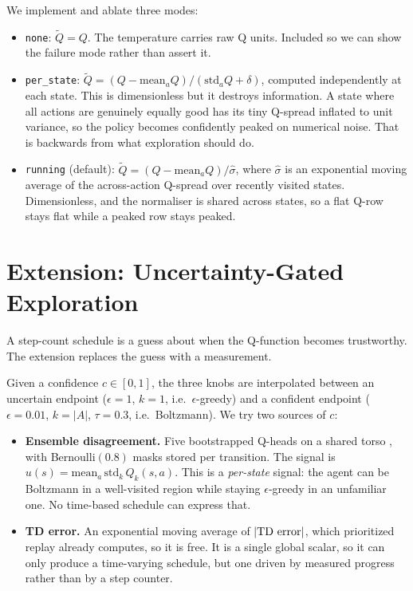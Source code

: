 \documentclass[11pt,a4paper]{article}
\begin{document}
We implement and ablate three modes:

\begin{itemize}
\item \texttt{none}: $\tilde{Q} = Q$. The temperature carries raw Q units.
      Included so we can show the failure mode rather than assert it.
\item \texttt{per\_state}: $\tilde{Q} = (Q - \mathrm{mean}_a Q)/(\mathrm{std}_a Q + \delta)$,
      computed independently at each state. This is dimensionless but it
      destroys information. A state where all actions are genuinely equally
      good has its tiny Q-spread inflated to unit variance, so the policy
      becomes confidently peaked on numerical noise. That is backwards from
      what exploration should do.
\item \texttt{running} (default): $\tilde{Q} = (Q - \mathrm{mean}_a Q)/\hat{\sigma}$,
      where $\hat{\sigma}$ is an exponential moving average of the
      across-action Q-spread over recently visited states. Dimensionless, and
      the normaliser is shared across states, so a flat Q-row stays flat while
      a peaked row stays peaked.
\end{itemize}

\section{Extension: Uncertainty-Gated Exploration}
\label{sec:extension}

A step-count schedule is a guess about when the Q-function becomes
trustworthy. The extension replaces the guess with a measurement.

Given a confidence $c \in [0,1]$, the three knobs are interpolated between an
uncertain endpoint ($\epsilon = 1$, $k = 1$, i.e.\ $\epsilon$-greedy) and a
confident endpoint ($\epsilon = 0.01$, $k = |A|$, $\tau = 0.3$, i.e.\
Boltzmann). We try two sources of $c$:

\begin{itemize}
\item \textbf{Ensemble disagreement.} Five bootstrapped Q-heads on a shared
      torso \cite{osband2016}, with Bernoulli$(0.8)$ masks stored per
      transition. The signal is $u(s) = \mathrm{mean}_a \, \mathrm{std}_k \, Q_k(s,a)$.
      This is a \emph{per-state} signal: the agent can be Boltzmann in a
      well-visited region while staying $\epsilon$-greedy in an unfamiliar one.
      No time-based schedule can express that.
\item \textbf{TD error.} An exponential moving average of $|{\rm TD\ error}|$,
      which prioritized replay already computes, so it is free. It is a single
      global scalar, so it can only produce a time-varying schedule, but one
      driven by measured progress rather than by a step counter.
\end{itemize}
\end{document}
